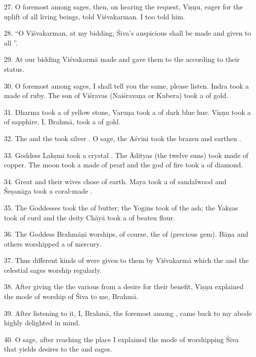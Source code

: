 27. O foremost among sages, then, on hearing the request, Viṣṇu, eager for
the uplift of all living beings, told Viśvakarman. I too told him.

28. “O Viśvakarman, at my bidding, Śiva’s auspicious  shall be made
and given to all ”.

29. At our bidding Viśvakarmā made  and gave them to the 
according to their status.

30. O foremost among sages, I shall tell you the same, please listen. Indra took
a  made of ruby. The son of Viśravas (Naiśravaṇa or Kubera) took
a  of gold.

31. Dharma took a  of yellow stone, Varuṇa took a  of dark
blue hue. Viṣṇu took a  of sapphire. I, Brahmā, took a 
of gold.

32. The  and the  took silver . O sage,
the Aśvini  took the brazen and earthen .

33. Goddess Lakṣmī took a crystal . The Ādityas (the twelve suns) took
 made of copper. The moon took a  made of pearl and
the god of fire took a  of diamond.

34. Great  and their wives chose  of earth. Maya took
a  of sandalwood and Śeṣanāga took a coral-made .

35. The Goddesses took the  of butter; the Yogins took  of
the ash; the Yakṣas took  of curd and the deity Chāyā took
a  of beaten flour.

36. The Goddess Brahmāṇī worships, of course, the  of 
(precious gem). Bāṇa and others worshipped a  of mercury.

37. Thus different kinds of  were given to them by Viśvakarmā which
the  and the celestial sages worship regularly.

38. After giving the  the various  from a desire for their
benefit, Viṣṇu explained the mode of worship of Śiva to me, Brahmā.

39. After listening to it, I, Brahmā, the foremost among , came back
to my abode highly delighted in mind.

40. O sage, after reaching the place I explained the mode of worshipping Śiva
that yields desires to the  and sages.

